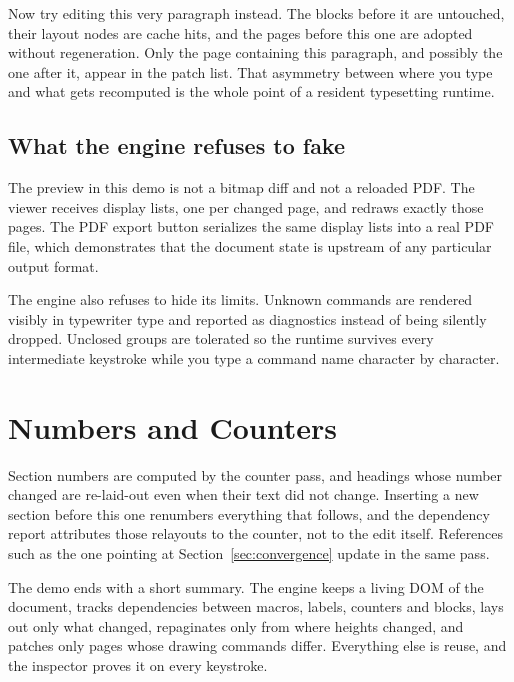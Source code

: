 \documentclass{article}
\begin{document}
Now try editing this very paragraph instead. The blocks before it are
untouched, their layout nodes are cache hits, and the pages before
this one are adopted without regeneration. Only the page containing
this paragraph, and possibly the one after it, appear in the patch
list. That asymmetry between where you type and what gets recomputed
is the whole point of a resident typesetting runtime.

\subsection{What the engine refuses to fake}
\label{sec:honest}

The preview in this demo is not a bitmap diff and not a reloaded PDF.
The viewer receives display lists, one per changed page, and redraws
exactly those pages. The PDF export button serializes the same
display lists into a real PDF file, which demonstrates that the
document state is upstream of any particular output format.

The engine also refuses to hide its limits. Unknown commands are
rendered visibly in typewriter type and reported as diagnostics
instead of being silently dropped. Unclosed groups are tolerated so
the runtime survives every intermediate keystroke while you type a
command name character by character.

\section{Numbers and Counters}
\label{sec:counters}

Section numbers are computed by the counter pass, and headings whose
number changed are re-laid-out even when their text did not change.
Inserting a new section before this one renumbers everything that
follows, and the dependency report attributes those relayouts to the
counter, not to the edit itself. References such as the one pointing
at Section~\ref{sec:convergence} update in the same pass.

The demo ends with a short summary. The engine keeps a living DOM of
the document, tracks dependencies between macros, labels, counters
and blocks, lays out only what changed, repaginates only from where
heights changed, and patches only pages whose drawing commands
differ. Everything else is reuse, and the inspector proves it on
every keystroke.
\end{document}
